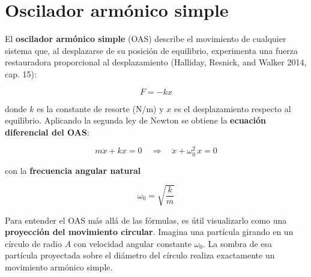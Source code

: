 \documentclass[
  letterpaper,
  DIV=11,
  numbers=noendperiod]{scrreprt}
\begin{document}
\chapter{Oscilador armónico simple}\label{sec-oscilador}

El \textbf{oscilador armónico simple} (OAS) describe el movimiento de
cualquier sistema que, al desplazarse de su posición de equilibrio,
experimenta una fuerza restauradora proporcional al desplazamiento
(Halliday, Resnick, and Walker 2014, cap. 15):

\[
F = -kx
\]

donde \(k\) es la constante de resorte (N/m) y \(x\) es el
desplazamiento respecto al equilibrio. Aplicando la segunda ley de
Newton se obtiene la \textbf{ecuación diferencial del OAS}:

\[
m\ddot{x} + kx = 0
\quad \Longrightarrow \quad
\ddot{x} + \omega_0^2\, x = 0
\]

con la \textbf{frecuencia angular natural}

\[
\boxed{\omega_0 = \sqrt{\frac{k}{m}}}
\]

Para entender el OAS más allá de las fórmulas, es útil visualizarlo como
una \textbf{proyección del movimiento circular}. Imagina una partícula
girando en un círculo de radio \(A\) con velocidad angular constante
\(\omega_0\). La sombra de esa partícula proyectada sobre el diámetro
del círculo realiza exactamente un movimiento armónico simple.
\end{document}
